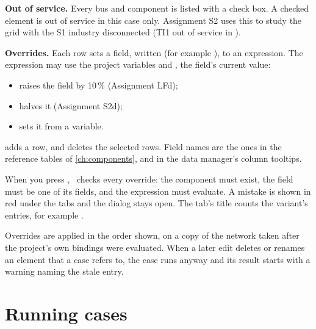 \begin{minipage}[t]{0.5\linewidth}
\textbf{Out of service.} Every bus and component is listed with a check box. A checked
element is out of service in this case only. Assignment S2 uses this to study the grid
with the S1 industry disconnected (TI1 out of service in ).

\textbf{Overrides.} Each row sets a field, written  (for example
), to an expression. The expression may use the project variables and
, the field's current value:

\begin{itemize}
  \item {} raises the field by 10\,\% (Assignment LFd);
  \item {} halves it (Assignment S2d);
  \item {} sets it from a variable.
\end{itemize}

 adds a row, and  deletes the selected rows. Field names
are the ones in the reference tables of \cref{ch:components}, and in the data manager's
column tooltips.
\end{minipage}\hfill
\begin{minipage}[t]{0.45\linewidth}\vspace{0pt}
  \centering{}
\end{minipage}

When you press , \app\ checks every override: the component must exist, the field
must be one of its fields, and the expression must evaluate. A mistake is shown in red
under the tabs and the dialog stays open. The tab's title counts the variant's entries,
for example .

\begin{note}
Overrides are applied in the order shown, on a copy of the network taken after the
project's own bindings were evaluated. When a later edit deletes or renames an element
that a case refers to, the case runs anyway and its result starts with a warning naming
the stale entry.
\end{note}

\section{Running cases}

